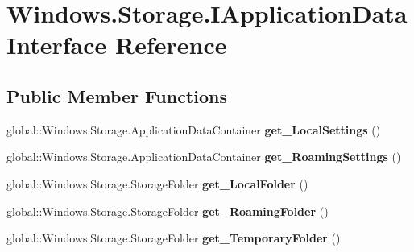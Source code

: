 \hypertarget{interface_windows_1_1_storage_1_1_i_application_data}{}\section{Windows.\+Storage.\+I\+Application\+Data Interface Reference}
\label{interface_windows_1_1_storage_1_1_i_application_data}
\subsection*{Public Member Functions}
\begin{DoxyCompactItemize}
\item 
\mbox{\label{interface_windows_1_1_storage_1_1_i_application_data_ad910253c6d0b20d011dce17a29c99e02}} 
global\+::\+Windows.\+Storage.\+Application\+Data\+Container {\bfseries get\+\_\+\+Local\+Settings} ()
\item 
\mbox{\label{interface_windows_1_1_storage_1_1_i_application_data_a06655cd8ae7b5ba39077359585d19cea}} 
global\+::\+Windows.\+Storage.\+Application\+Data\+Container {\bfseries get\+\_\+\+Roaming\+Settings} ()
\item 
\mbox{\label{interface_windows_1_1_storage_1_1_i_application_data_ae3fadf1db189f66f22c74d1ee0e4b1bc}} 
global\+::\+Windows.\+Storage.\+Storage\+Folder {\bfseries get\+\_\+\+Local\+Folder} ()
\item 
\mbox{\label{interface_windows_1_1_storage_1_1_i_application_data_a408ead99bd13a953bad06b2efaba4fb0}} 
global\+::\+Windows.\+Storage.\+Storage\+Folder {\bfseries get\+\_\+\+Roaming\+Folder} ()
\item 
\mbox{\label{interface_windows_1_1_storage_1_1_i_application_data_a7cc8d124ebf36fe0c0d96117a3e09ff2}} 
global\+::\+Windows.\+Storage.\+Storage\+Folder {\bfseries get\+\_\+\+Temporary\+Folder} ()
\item 
\mbox{\label{interface_windows_1_1_storage_1_1_i_application_data_ad910253c6d0b20d011dce17a29c99e02}} 

\end{DoxyCompactItemize}
